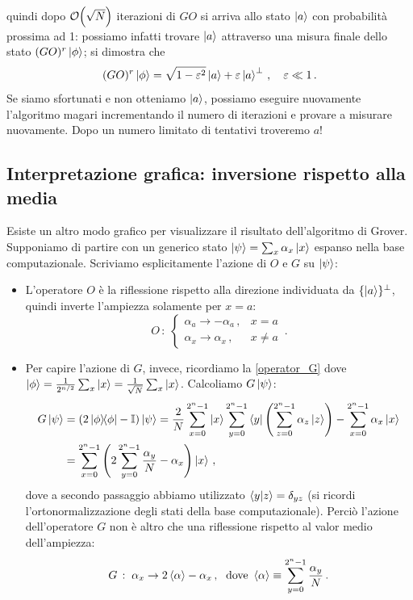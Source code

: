 quindi dopo $\order{\sqrt N}$ iterazioni di $GO$ si arriva allo stato $\ket a$ con probabilità prossima ad 1: possiamo infatti trovare $\ket a$ attraverso una misura finale dello stato $(GO)^r\ket \phi$; si dimostra che  
\begin{equation*}
    (GO)^r\ket \phi = \sqrt{1-\varepsilon^2}\ket a + \varepsilon \ket{a}^\perp \, , \quad \varepsilon \ll 1 \, .
\end{equation*}
Se siamo sfortunati e non otteniamo $\ket a$, possiamo eseguire nuovamente l'algoritmo magari incrementando il numero di iterazioni e provare a misurare nuovamente. Dopo un numero limitato di tentativi troveremo $a$!


\subsection{Interpretazione grafica: inversione rispetto alla media}
Esiste un altro modo grafico per visualizzare il risultato dell'algoritmo di Grover. Supponiamo di partire con un generico stato $\ket \psi = \sum_x \alpha_x \ket x$ espanso nella base computazionale. Scriviamo esplicitamente l'azione di $O$ e $G$ su $\ket{\psi}$:
\begin{itemize}
    \item L'operatore $O$ è la riflessione rispetto alla direzione individuata da $\{ \ket{a} \}^\perp$, quindi inverte l'ampiezza solamente per $x=a$:
    \begin{equation*}
        O \, : \;
        \begin{cases}
            \alpha_a \rightarrow -\alpha_a \, , &x=a\\
            \alpha_x \rightarrow \alpha_x \, , &x\neq a
        \end{cases} \, .
    \end{equation*}
    
    \item Per capire l'azione di $G$, invece, ricordiamo la \eqref{operator_G} dove $\ket{\phi} = \frac{1}{2^{n/2}} \sum_x \ket{x} = \frac{1}{\sqrt{N}} \sum_x \ket{x}$. Calcoliamo $G \ket{\psi}$:
    \begin{align*}
        G \ket{\psi} &= \left( 2 \op{\phi} - \mathbb{I} \right) \ket{\psi} = \frac{2}{N} \sum_{x=0}^{2^n-1} \ket{x} \sum_{y=0}^{2^n-1} \bra{y} \left( \sum_{z=0}^{2^n-1} \alpha_z \ket{z} \right) - \sum_{x=0}^{2^n-1} \alpha_x \ket{x} \\
        &= \sum_{x=0}^{2^n-1} \left( 2 \sum_{y=0}^{2^n-1} \frac{\alpha_y}{N} - \alpha_x \right) \ket{x} \, ,
    \end{align*}
    dove a secondo passaggio abbiamo utilizzato $\braket{y}{z} = \delta_{yz}$ (si ricordi l'ortonormalizzazione degli stati della base computazionale). Perciò l'azione dell'operatore $G$ non è altro che una riflessione rispetto al valor medio dell'ampiezza:
    \begin{equation*}
        G \, : \; \alpha_x \rightarrow 2 \expval{\alpha} - \alpha_x \, , \; \text{ dove } \expval{\alpha} \equiv \sum_{y=0}^{2^n-1} \frac{\alpha_y}{N} \, .
    \end{equation*}
\end{itemize}
